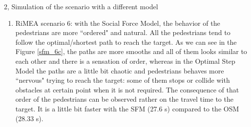 \documentclass[10pt,a4paper]{article}
\begin{document}
\begin{task}{2, Simulation of the scenario with a different model}
\begin{enumerate}[label=(\alph*)]
    \begin{figure} [H]
    \centering
        \caption{Different stages of the simulation of the scenario 1 using the Social Force Model}
        \label{scenario1_sfm}
    \end{figure}
    
    
    \item RiMEA scenario 6: with the Social Force Model, the behavior of the pedestrians are more ``ordered" and natural. All the pedestrians tend to follow the optimal/shortest path to reach the target. As we can see in the Figure \ref{sfm_6c}, the paths are more smooths and all of them looks similar to each other and there is a sensation of order, whereas in the Optimal Step Model the paths are a little bit chaotic and pedestrians behaves more ``nervous" trying to reach the target: some of them stops or collide with obstacles at certain point when it is not required. The consequence of that order of the pedestrians can be observed rather on the travel time to the target. It is a little bit faster with the SFM (27.6 s) compared to the OSM (28.33 s). 
    

\end{enumerate}
\end{task}
\end{document}
